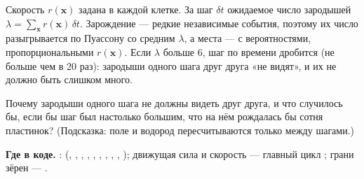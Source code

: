 Скорость $r(\mathbf x)$ задана в каждой клетке. За шаг $\delta t$ ожидаемое число зародышей
$\lambda=\sum_{\mathbf x}r(\mathbf x)\,\delta t$. Зарождение --- редкие независимые события, поэтому
их число разыгрывается по Пуассону со средним $\lambda$, а места --- с вероятностями,
пропорциональными $r(\mathbf x)$. Если $\lambda$ больше 6, шаг по времени дробится (не больше чем
в 20 раз): зародыши одного шага друг друга «не видят», и их не должно быть слишком много.

\begin{exercise}
Почему зародыши одного шага не должны видеть друг друга, и что случилось бы, если бы шаг был
настолько большим, что на нём рождалась бы сотня пластинок? (Подсказка: поле и водород
пересчитываются только между шагами.)
\end{exercise}

\begin{codebox}
\textbf{Где в коде.} :  (, , ,
, , , , , , );
движущая сила и скорость --- главный цикл ; грани зёрен ---
.
\end{codebox}
